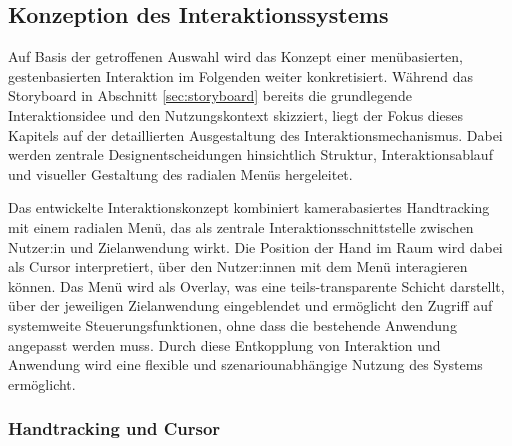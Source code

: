 \subsection{Konzeption des Interaktionssystems} %
\label{sec:synthese_konzeption_des_interaktionssystems}





Auf Basis der getroffenen Auswahl wird das Konzept einer menübasierten, gestenbasierten Interaktion im Folgenden weiter konkretisiert. Während das Storyboard in Abschnitt \ref{sec:storyboard} bereits die grundlegende Interaktionsidee und den Nutzungskontext skizziert, liegt der Fokus dieses Kapitels auf der detaillierten Ausgestaltung des Interaktionsmechanismus.
Dabei werden zentrale Designentscheidungen hinsichtlich Struktur, Interaktionsablauf und visueller Gestaltung des radialen Menüs hergeleitet.

Das entwickelte Interaktionskonzept kombiniert kamerabasiertes Handtracking mit einem radialen Menü, das als zentrale Interaktionsschnittstelle zwischen Nutzer:in und Zielanwendung wirkt. Die Position der Hand im Raum wird dabei als Cursor interpretiert, über den Nutzer:innen mit dem Menü interagieren können. Das Menü wird als Overlay, was eine teils-transparente Schicht darstellt, über der jeweiligen Zielanwendung eingeblendet und ermöglicht den Zugriff auf systemweite Steuerungsfunktionen, ohne dass die bestehende Anwendung angepasst werden muss.
Durch diese Entkopplung von Interaktion und Anwendung wird eine flexible und szenariounabhängige Nutzung des Systems ermöglicht.

\subsubsection{Handtracking und Cursor}
\label{sec:synthese_handtracking}

